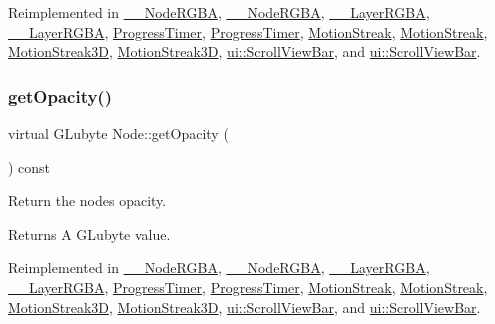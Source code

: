 Reimplemented in \hyperlink{class____NodeRGBA_a48a5a78aea7c307ccfbe8c10e053b7c8}{\+\_\+\+\_\+\+Node\+R\+G\+BA}, \hyperlink{class____NodeRGBA_a48a5a78aea7c307ccfbe8c10e053b7c8}{\+\_\+\+\_\+\+Node\+R\+G\+BA}, \hyperlink{class____LayerRGBA_a61d071eeff8bc1c46520611261f5dd1a}{\+\_\+\+\_\+\+Layer\+R\+G\+BA}, \hyperlink{class____LayerRGBA_a61d071eeff8bc1c46520611261f5dd1a}{\+\_\+\+\_\+\+Layer\+R\+G\+BA}, \hyperlink{classProgressTimer_ab65270de82c7f02e733ce017830c2409}{Progress\+Timer}, \hyperlink{classProgressTimer_ae9f8f93b5849d34fce2fa84ffec463c1}{Progress\+Timer}, \hyperlink{classMotionStreak_a7e7bfd8eb37092a0477b2c1012e179c2}{Motion\+Streak}, \hyperlink{classMotionStreak_a433b068de6c2246676c0654480cb9ea2}{Motion\+Streak}, \hyperlink{classMotionStreak3D_aae52587b7c2cb5833f133b40add6a860}{Motion\+Streak3D}, \hyperlink{classMotionStreak3D_ad801e665463b5ed5b60a2d01468ddb89}{Motion\+Streak3D}, \hyperlink{classui_1_1ScrollViewBar_a6c36fff342601b1ab29afaed5e4e201d}{ui\+::\+Scroll\+View\+Bar}, and \hyperlink{classui_1_1ScrollViewBar_a6c36fff342601b1ab29afaed5e4e201d}{ui\+::\+Scroll\+View\+Bar}.

\mbox{\label{classNode_a46206e9eb52b57c070446613659fe310}} 
\subsubsection{\texorpdfstring{get\+Opacity()}{getOpacity()}\hspace{0.1cm}{\footnotesize\ttfamily [2/2]}}
{\footnotesize\ttfamily virtual G\+Lubyte Node\+::get\+Opacity (\begin{DoxyParamCaption}{ }\end{DoxyParamCaption}) const\hspace{0.3cm}{\ttfamily [virtual]}}

Return the node\textquotesingle{}s opacity. \begin{DoxyReturn}{Returns}
A G\+Lubyte value. 
\end{DoxyReturn}


Reimplemented in \hyperlink{class____NodeRGBA_a48a5a78aea7c307ccfbe8c10e053b7c8}{\+\_\+\+\_\+\+Node\+R\+G\+BA}, \hyperlink{class____NodeRGBA_a48a5a78aea7c307ccfbe8c10e053b7c8}{\+\_\+\+\_\+\+Node\+R\+G\+BA}, \hyperlink{class____LayerRGBA_a61d071eeff8bc1c46520611261f5dd1a}{\+\_\+\+\_\+\+Layer\+R\+G\+BA}, \hyperlink{class____LayerRGBA_a61d071eeff8bc1c46520611261f5dd1a}{\+\_\+\+\_\+\+Layer\+R\+G\+BA}, \hyperlink{classProgressTimer_ab65270de82c7f02e733ce017830c2409}{Progress\+Timer}, \hyperlink{classProgressTimer_ae9f8f93b5849d34fce2fa84ffec463c1}{Progress\+Timer}, \hyperlink{classMotionStreak_a7e7bfd8eb37092a0477b2c1012e179c2}{Motion\+Streak}, \hyperlink{classMotionStreak_a433b068de6c2246676c0654480cb9ea2}{Motion\+Streak}, \hyperlink{classMotionStreak3D_aae52587b7c2cb5833f133b40add6a860}{Motion\+Streak3D}, \hyperlink{classMotionStreak3D_ad801e665463b5ed5b60a2d01468ddb89}{Motion\+Streak3D}, \hyperlink{classui_1_1ScrollViewBar_a6c36fff342601b1ab29afaed5e4e201d}{ui\+::\+Scroll\+View\+Bar}, and \hyperlink{classui_1_1ScrollViewBar_a6c36fff342601b1ab29afaed5e4e201d}{ui\+::\+Scroll\+View\+Bar}.

